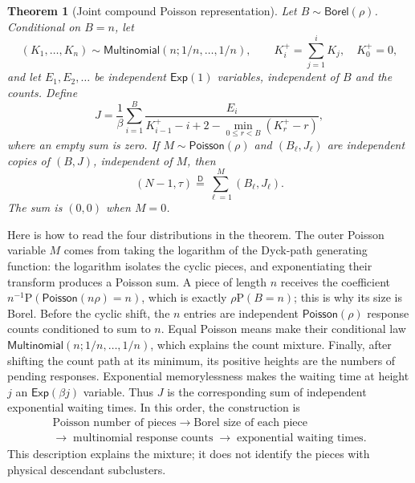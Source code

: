 \documentclass[11pt]{article}
\newcommand{\PP}[1]{\mathrm{P}\left(#1\right)}
\newtheorem{theorem}{Theorem}
\begin{document}
\begin{theorem}[Joint compound Poisson representation]\label{jointDecomp}
Let $B\sim\mathsf{Borel}(\rho)$. Conditional on $B=n$, let
\[
(K_1,\ldots,K_n)\sim\mathsf{Multinomial}(n;1/n,\ldots,1/n),
\qquad K_i^+=\sum_{j=1}^iK_j,\quad K_0^+=0,
\]
and let $E_1,E_2,\ldots$ be independent $\mathsf{Exp}(1)$ variables,
independent of $B$ and the counts. Define
\begin{equation}\label{markDef}
J=\frac1\beta\sum_{i=1}^B
\frac{E_i}{K_{i-1}^+-i+2-\min_{0\le r<B}(K_r^+-r)},
\end{equation}
where an empty sum is zero. If $M\sim\mathsf{Poisson}(\rho)$ and
$(B_\ell,J_\ell)$ are independent copies of $(B,J)$, independent of
$M$, then
\begin{equation}\label{jointDecompEq}
(N-1,\tau)\stackrel{\mathsf D}{=}
\sum_{\ell=1}^M(B_\ell,J_\ell).
\end{equation}
The sum is $(0,0)$ when $M=0$.
\end{theorem}

Here is how to read the four distributions in the theorem. The outer
Poisson variable $M$ comes from taking the logarithm of the Dyck-path
generating function: the logarithm isolates the cyclic pieces, and
exponentiating their transform produces a Poisson sum. A piece of
length $n$ receives the coefficient
$n^{-1}\PP{\mathsf{Poisson}(n\rho)=n}$, which is exactly
$\rho\PP{B=n}$; this is why its size is Borel. Before the cyclic shift,
the $n$ entries are independent $\mathsf{Poisson}(\rho)$ response
counts conditioned to sum to $n$. Equal Poisson means make their
conditional law $\mathsf{Multinomial}(n;1/n,\ldots,1/n)$, which
explains the count mixture. Finally, after shifting the count path at
its minimum, its positive heights are the numbers of pending responses.
Exponential memorylessness makes the waiting time at height $j$ an
$\mathsf{Exp}(\beta j)$ variable. Thus $J$ is the corresponding sum of
independent exponential waiting times. In this order, the construction is
\[
\begin{gathered}
\text{Poisson number of pieces}
\;\longrightarrow\;\text{Borel size of each piece}\\
\longrightarrow\;\text{multinomial response counts}
\;\longrightarrow\;\text{exponential waiting times}.
\end{gathered}
\]
This description explains the mixture; it does not identify the pieces
with physical descendant subclusters.
\end{document}

